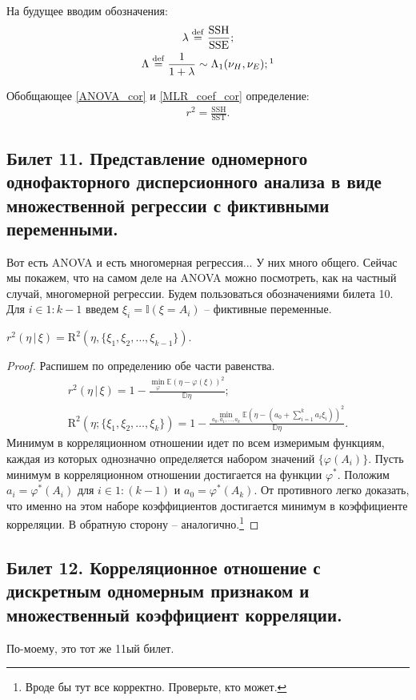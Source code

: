 На будущее вводим обозначения:
\begin{gather*}
    \lambda \overset{\mathrm{def}}{=} \mathrm{\frac{SSH}{SSE}};\\
    \Lambda \overset{\mathrm{def}}{=} \frac{1}{1 + \lambda} \sim \Lambda_1 (\nu_H, \nu_E);\footnotemark
\end{gather*}

Обобщающее \eqref{ANOVA_cor} и \eqref{MLR_coef_cor} определение:
\begin{gather*}
    r^2 = \mathrm{\frac{SSH}{SST}}. 
\end{gather*}


\subsection{Билет 11. Представление одномерного однофакторного дисперсионного анализа в виде множественной регрессии с фиктивными переменными.}

Вот есть ANOVA и есть многомерная регрессия... У них много общего. Сейчас мы покажем, что на самом деле на ANOVA можно посмотреть, как на частный случай, многомерной регрессии.
Будем пользоваться обозначениями билета 10.
Для $i \in 1:{k-1}$ введем $\xi_i = \mathbb I (\xi = A_i)$ -- фиктивные переменные.

\begin{thm}
    $r^2(\eta \, | \, \xi) = \mathrm R^2 (\eta, \{\xi_1, \xi_2, \ldots, \xi_{k-1}\})$.
\end{thm}
\begin{proof}
    Распишем по определению обе части равенства.
    \begin{gather*}
        r^2(\eta \, | \, \xi) = 1 - \frac{\min_{\varphi} \mathbb E(\eta - \varphi(\xi))^2}{\mathbb D \eta};\\
        \mathrm R^2(\eta; \{\xi_1, \xi_2, \ldots, \xi_k\}) = 1 - \frac{\min_{a_0, a_1, \ldots, a_k} {\mathbb E}(\eta - (a_0 + \sum_{i=1}^k a_i \xi_i))^2}{{\mathbb D} \eta}.
    \end{gather*}
    Минимум в корреляционном отношении идет по всем измеримым функциям, каждая из которых однозначно определяется набором значений $\{\varphi(A_i)\}$.
    Пусть минимум в корреляционном отношении достигается на функции $\varphi^*$. Положим $a_i = \varphi^*(A_i)$ для $i \in 1:(k-1)$ и $a_0 = \varphi^*(A_k)$.
    От противного легко доказать, что именно на этом наборе коэффициентов достигается минимум в коэффициенте корреляции.
    В обратную сторону -- аналогично.\footnote{\color{blue} Вроде бы тут все корректно. Проверьте, кто может.}
\end{proof}

\subsection{Билет 12. Корреляционное отношение с дискретным одномерным признаком и множественный коэффициент корреляции.}

По-моему, это тот же 11ый билет.
